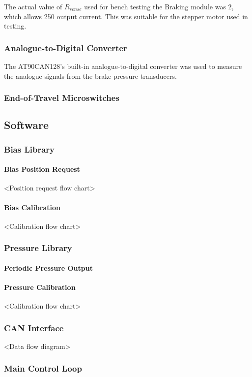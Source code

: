 The actual value of $R_{sense}$ used for bench testing the Braking module was \unit{2}{\ohm}, which allows \unit{250}{\milli\ampere} output current. This was suitable for the stepper motor used in testing.

\subsubsection{Analogue-to-Digital Converter}

The AT90CAN128's built-in analogue-to-digital converter was used to measure the analogue signals from the brake pressure transducers.

\subsubsection{End-of-Travel Microswitches}


\subsection{Software}


\subsubsection{Bias Library}


\paragraph{Bias Position Request}

<Position request flow chart>


\paragraph{Bias Calibration}

<Calibration flow chart>


\subsubsection{Pressure Library}


\paragraph{Periodic Pressure Output}


\paragraph{Pressure Calibration}

<Calibration flow chart>


\subsubsection{CAN Interface}

<Data flow diagram>


\subsubsection{Main Control Loop}